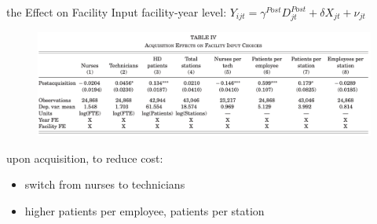 \begin{frame}{the Effect on Facility Input}
    facility-year level: 
    $Y_{ijt}= \gamma^{Post}D^{Post}_{jt}+\delta X_{jt} + \nu_{jt}$
    \begin{figure}
        \centering
        \includegraphics[width=0.8\linewidth]{tb4.png}
    \end{figure}
    upon acquisition, to reduce cost:
    \begin{itemize}
        \item switch from nurses to technicians
        \item higher patients per employee, patients per station
    \end{itemize}
\end{frame}